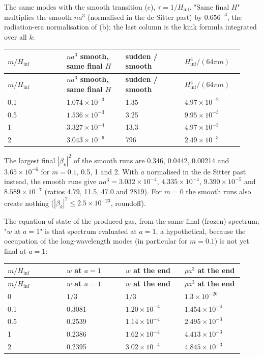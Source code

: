 \documentclass[11pt]{article}
\begin{document}
The same modes with the smooth transition (c), $\tau=1/H_{\mathrm{inf}}$. "Same final $H$" multiplies the smooth $na^3$ (normalised in the de Sitter past) by $0.656^{-3}$, the radiation-era normalisation of (b); the last column is the kink formula integrated over all $k$:

\begin{longtable}{@{}p{0.230\linewidth}p{0.230\linewidth}p{0.230\linewidth}p{0.230\linewidth}@{}}
\toprule
\textbf{$m/H_{\mathrm{inf}}$} & \textbf{$na^3$ smooth, same final $H$} & \textbf{sudden / smooth} & \textbf{$H_{\mathrm{inf}}^4/(64\pi m)$} \\
\midrule
\endfirsthead
\toprule
\textbf{$m/H_{\mathrm{inf}}$} & \textbf{$na^3$ smooth, same final $H$} & \textbf{sudden / smooth} & \textbf{$H_{\mathrm{inf}}^4/(64\pi m)$} \\
\midrule
\endhead
0.1 & $1.074\times10^{-3}$ & 1.35 & $4.97\times10^{-2}$ \\
0.5 & $1.536\times10^{-3}$ & 3.25 & $9.95\times10^{-3}$ \\
1 & $3.327\times10^{-4}$ & 13.3 & $4.97\times10^{-3}$ \\
2 & $3.043\times10^{-6}$ & 796 & $2.49\times10^{-3}$ \\
\bottomrule
\end{longtable}

The largest final $|\beta_k|^2$ of the smooth runs are 0.346, 0.0442, 0.00214 and $3.65\times10^{-6}$ for $m=0.1$, 0.5, 1 and 2. With $a$ normalised in the de Sitter past instead, the smooth runs give $na^3=3.032\times10^{-4}$, $4.335\times10^{-4}$, $9.390\times10^{-5}$ and $8.589\times10^{-7}$ (ratios 4.79, 11.5, 47.0 and 2819). For $m=0$ the smooth runs also create nothing ($|\beta_k|^2\le2.5\times10^{-23}$, roundoff).

The equation of state of the produced gas, from the same final (frozen) spectrum; "$w$ at $a=1$" is that spectrum evaluated at $a=1$, a hypothetical, because the occupation of the long-wavelength modes (in particular for $m=0.1$) is not yet final at $a=1$:

\begin{longtable}{@{}p{0.230\linewidth}p{0.230\linewidth}p{0.230\linewidth}p{0.230\linewidth}@{}}
\toprule
\textbf{$m/H_{\mathrm{inf}}$} & \textbf{$w$ at $a=1$} & \textbf{$w$ at the end} & \textbf{$\rho a^3$ at the end} \\
\midrule
\endfirsthead
\toprule
\textbf{$m/H_{\mathrm{inf}}$} & \textbf{$w$ at $a=1$} & \textbf{$w$ at the end} & \textbf{$\rho a^3$ at the end} \\
\midrule
\endhead
0 & $1/3$ & $1/3$ & $1.3\times10^{-26}$ \\
0.1 & 0.3081 & $1.20\times10^{-4}$ & $1.454\times10^{-4}$ \\
0.5 & 0.2539 & $1.14\times10^{-4}$ & $2.495\times10^{-3}$ \\
1 & 0.2386 & $1.62\times10^{-4}$ & $4.413\times10^{-3}$ \\
2 & 0.2395 & $3.02\times10^{-4}$ & $4.845\times10^{-3}$ \\
\bottomrule
\end{longtable}
\end{document}

